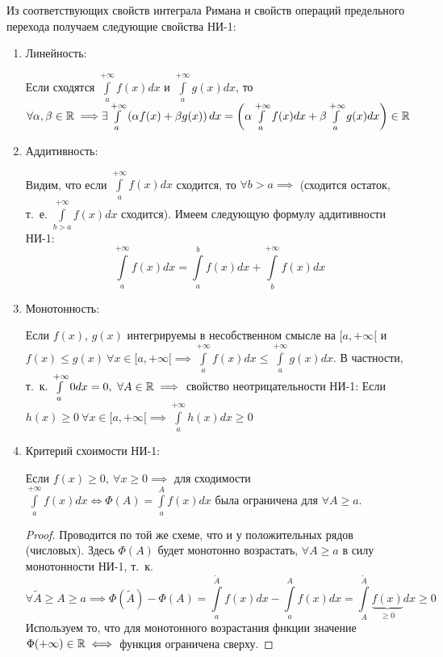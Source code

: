 \documentclass[../../main.tex]{subfiles}
\begin{document}
Из соответствующих свойств интеграла Римана и свойств операций предельного
перехода получаем следующие свойства НИ-1:
\begin{enumerate}
        \item Линейность:
        
        Если сходятся $\int\limits_a^{+\infty} f(x)dx$ и
        $\int\limits_a^{+\infty} g(x)dx$, то $\forall \alpha, \beta \in \mathbb{R}
        \implies \\ \exists \int\limits_a^{+\infty} \left( \alpha f(x)
        + \beta g(x) \right)dx = \left( \alpha \int\limits_a^{+\infty}
        f(x)dx + \beta \int\limits_a^{+\infty} g(x)dx \right) \in \mathbb{R} $
        \item Аддитивность:
        
        Видим, что если $\int\limits_a^{+\infty} f(x)dx$ сходится, то
        $\forall b>a \implies$ (сходится остаток, т.~е.
        $\int\limits_{b>a}^{+\infty} f(x)dx$ сходится). Имеем следующую формулу
        аддитивности НИ-1:
        \[\int\limits_a^{+\infty} f(x)dx = \int\limits_a^b f(x)dx +
        \int\limits_b^{+\infty} f(x)dx \]
        \item Монотонность:
        
        Если $f(x)$, $g(x)$ интегрируемы в несобственном смысле на
        $[a, +\infty[$
        и $f(x) \leq g(x) \ \forall x \in [a, +\infty[ \implies
        \int\limits_a^{+\infty} f(x)dx \leq \int\limits_a^{+\infty} g(x)dx $.
        В частности, т.~к. $\int\limits_a^{+\infty} 0dx = 0, \ \forall A \in \mathbb{R}
        \implies$ свойство неотрицательности НИ-1: Если $h(x) \geq 0 \
        \forall x \in
        [a, +\infty[ \implies \int\limits_a^{+\infty} h(x)dx \geq 0$
        \item Критерий схоимости НИ-1:
        
        Если $f(x) \geq 0, \ \forall x \geq 0 \implies$ для сходимости
        $ \int\limits_a^{+\infty} f(x)dx \iff \Phi(A) =
        \int\limits_a^{A} f(x)dx$ была ограничена для $\forall A \geq a$.
        \begin{proof}
            Проводится по той же схеме, что и у положительных рядов (числовых).
            Здесь $\Phi(A)$ будет монотонно возрастать, $\forall A \geq a$
            в силу монотонности НИ-1, т.~к.
            \[\forall \tilde{A} \geq A \geq a
            \implies \Phi(\tilde{A}) - \Phi(A) =
            \int\limits_a^{\tilde{A}} f(x)dx - \int\limits_a^{A} f(x)dx =
            \int\limits_A^{\tilde{A}} \underbrace{f(x)}_{\geq 0} dx \geq 0 \]
            Используем то, что для монотонного возрастания фнкции значение
            $\Phi (+\infty) \in \mathbb{R} \iff$ функция ограничена сверху.
        \end{proof}
\end{enumerate}
\end{document}
